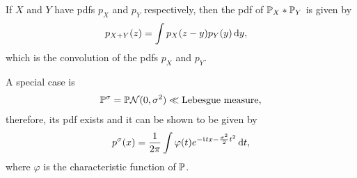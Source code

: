 \documentclass[12pt]{article}
\begin{document}
If $X$ and $Y$ have pdfs $p_X$ and $p_Y$ respectively, then the pdf of $\P_X *\P_Y$ is given by 
\begin{align*}
p_{X+Y}(z)	& = \int p_X(z-y)	p_Y(y) \,\mathrm{d} y,
\end{align*}
which is the convolution of the pdfs $p_X$ and $p_Y$. 

A special case is
\begin{align*}
\P^{\sigma}= \P * \calN (0,\sigma^2)\ll \text{Lebesgue measure}, 
\end{align*}
therefore, its pdf exists and it can be shown to be given by 
\begin{align}\label{wk10:psigma}
p^{\sigma}(x)=\frac{1}{2\pi}\int \varphi(t) e^{-\mathfrak{i}\mkern1mu tx-\frac{\sigma^2}{2}t^2} \,\mathrm{d} t,
\end{align}
where $\varphi$ is the characteristic function of $\P$.
\end{document}
